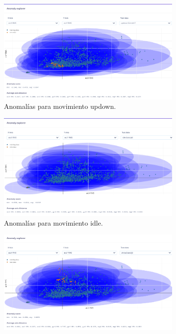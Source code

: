 \documentclass[12pt,a4paper]{article}
\begin{document}
\begin{itemize}
\begin{figure}[H]
    \centering
    \begin{subfigure}{0.31\textwidth}
        \centering
        \includegraphics[width=\linewidth]{Imagenes/anomaly_up.png}
        \caption{Anomalías para movimiento updown.}
        \label{fig:11}
    \end{subfigure}
    \hspace{0.02\textwidth} %
    \begin{subfigure}{0.31\textwidth}
        \centering
        \includegraphics[width=\linewidth]{Imagenes/anomaly_idle.png}
        \caption{Anomalías para movimiento idle.}
        \label{fig:12}
    \end{subfigure}
    \hspace{0.02\textwidth} %
    \begin{subfigure}{0.31\textwidth}
        \centering
        \includegraphics[width=\linewidth]{Imagenes/anomaly_circle.png}

\end{subfigure}
\end{figure}
\end{itemize}
\end{document}
